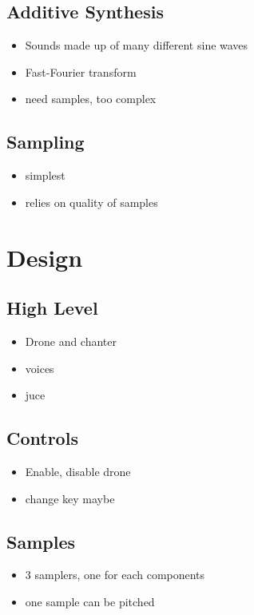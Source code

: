 \documentclass{article}
\begin{document}
	\subsection{Additive Synthesis}
	\begin{itemize}
		\item Sounds made up of many different sine waves
		\item Fast-Fourier transform
		\item need samples, too complex
	\end{itemize}
	
	\subsection{Sampling}
	\begin{itemize}
		\item simplest
		\item relies on quality of samples
	\end{itemize}

	
	\section{Design}
	
	\subsection{High Level}
	\begin{itemize}
		\item Drone and chanter
		\item voices
		\item juce
	\end{itemize}

	\subsection{Controls}
	\begin{itemize}
		\item Enable, disable drone
		\item change key maybe
	\end{itemize}
	
	\subsection{Samples}
	\begin{itemize}
		\item 3 samplers, one for each components
		\item one sample can be pitched
	\end{itemize}
\end{document}

